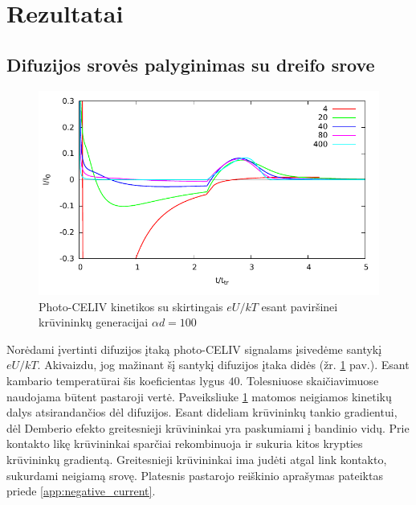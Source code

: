 \section{Rezultatai}

\subsection{Difuzijos srovės palyginimas su dreifo srove}

\begin{figure}[htb]
  \centering
    \includegraphics{./media/pdf/diff_drift.pdf}
  \caption{Photo-CELIV kinetikos su skirtingais $eU/kT$ esant paviršinei krūvininkų generacijai $\alpha d = 100$}
  \label{fig:comp}
\end{figure}

Norėdami įvertinti difuzijos įtaką photo-CELIV signalams įsivedėme santykį $eU/kT$. Akivaizdu, jog mažinant šį santykį difuzijos įtaka didės (žr. \ref{fig:comp} pav.). Esant kambario temperatūrai šis koeficientas lygus $40$. Tolesniuose skaičiavimuose naudojama būtent pastaroji vertė.
Paveiksliuke \ref{fig:comp} matomos neigiamos kinetikų dalys atsirandančios dėl difuzijos. Esant dideliam krūvininkų tankio gradientui, dėl Demberio efekto greitesnieji krūvininkai yra paskumiami į bandinio vidų. Prie kontakto likę krūvininkai sparčiai rekombinuoja ir sukuria kitos krypties krūvininkų gradientą. Greitesnieji krūvininkai ima judėti atgal link kontakto, sukurdami neigiamą srovę. Platesnis pastarojo reiškinio aprašymas pateiktas priede \ref{app:negative_current}.

